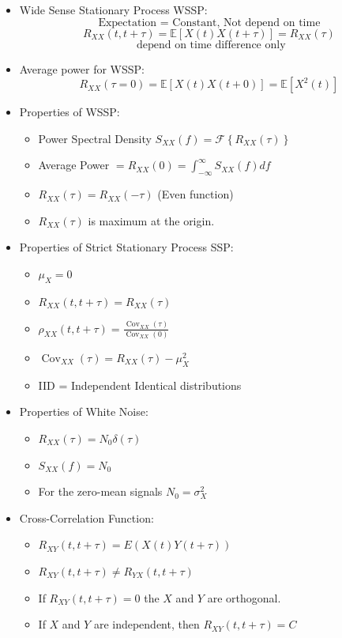\documentclass[10pt,landscape]{article}
\begin{document}
\begin{multicols*}{3}
\begin{itemize}
\item Wide Sense Stationary Process WSSP:
$$\text{Expectation = Constant, Not depend on time}$$
$$ R_{XX}(t,t+\tau) = \mathbb{E}[X(t)X(t+\tau)]= R_{XX}(\tau)$$
$$\text{ depend on time difference only}$$



\item Average power for WSSP:
$$ R_{XX}(\tau = 0) = \mathbb{E}[X(t)X(t+0)] = \mathbb{E}[X^2(t)]  $$
\item Properties of WSSP: \\
\begin{itemize}
    \item Power Spectral Density $S_{X X}(f)=\mathcal{F}\left\{R_{X X}(\tau)\right\}$
    \item Average Power $=R_{X X}(0)=\int_{-\infty}^{\infty} S_{XX}(f) df$
    \item $R_{XX}(\tau)=R_{X X}(-\tau)$ (Even function)
    \item $R_{X X}(\tau)$ is maximum at the origin.
\end{itemize}
\item Properties of Strict Stationary Process SSP:
\begin{itemize}
    \item  $\mu_X=0$
    \item  $R_{X X}(t, t+\tau) =R_{X X}(\tau) $
    \item  $\rho_{X X}(t, t+\tau)=\frac{\operatorname{Cov}_{X X}(\tau)}{\operatorname{Cov}_{X X}(0)}$
    \item $\operatorname{Cov}_{X X}(\tau) = R_{X X}(\tau) - \mu_X^2$
    \item {IID} = Independent Identical distributions
\end{itemize}
\item Properties of White Noise:
\begin{itemize}
    \item  $R_{X X}(\tau)=N_0 \delta(\tau)$
    \item  $ S_{X X}(f)=N_0 $
    \item For the zero-mean signals $N_0=\sigma_X^2$
\end{itemize}

\item Cross-Correlation Function:
\begin{itemize}
    \item $R_{X Y}(t, t+\tau)=E(X(t) Y(t+\tau))$
    \item $R_{X Y}(t, t+\tau) \neq R_{Y X}(t, t+\tau)$
\item If $R_{X Y}(t, t+\tau)=0$ the $X$ and $Y$ are orthogonal.
\item If $X$ and $Y$ are independent, then $R_{X Y}(t, t+\tau)= C$
\end{itemize}


\end{itemize}
\end{multicols*}
\end{document}
